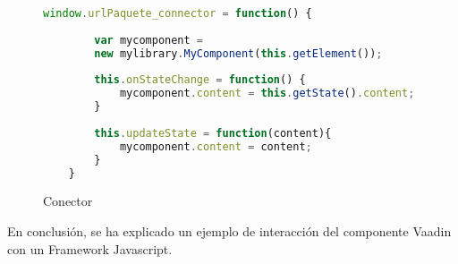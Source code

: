 \begin{figure}[!tb]
	\centering
	\begin{lstlisting}[language=JavaScript]
	window.urlPaquete_connector = function() {
	
		var mycomponent =
		new mylibrary.MyComponent(this.getElement());
		
		this.onStateChange = function() {
			mycomponent.content = this.getState().content;
		}
		
		this.updateState = function(content){
			mycomponent.content = content;
		}
	}\end{lstlisting}
	\caption{Conector}
	\label{fig:conectorDesc}
\end{figure}

En conclusión, se ha explicado un ejemplo de interacción del componente Vaadin con un Framework Javascript. 